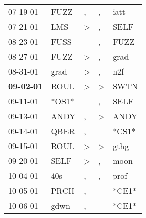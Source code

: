 \begin{supertabular}{p{0.07\textwidth}p{0.06\textwidth}p{0.02\textwidth}p{0.02\textwidth}p{0.06\textwidth}}
          07-19-01\textsuperscript{} &           FUZZ\textsuperscript{} &                , &                , &           iatt\textsuperscript{} \\
          07-21-01\textsuperscript{} &            LMS\textsuperscript{} &     \textgreater &                , &           SELF\textsuperscript{} \\
          08-23-01\textsuperscript{} &           FUSS\textsuperscript{} &                  &                , &           FUZZ\textsuperscript{} \\
          08-27-01\textsuperscript{} &           FUZZ\textsuperscript{} &     \textgreater &                , &           grad\textsuperscript{} \\
          08-31-01\textsuperscript{} &           grad\textsuperscript{} &     \textgreater &                , &            n2f\textsuperscript{} \\
 \textbf{09-02-01\textsuperscript{}} &           ROUL\textsuperscript{} &     \textgreater &     \textgreater &           SWTN\textsuperscript{} \\
          09-11-01\textsuperscript{} &                            *OS1* &                  &                , &           SELF\textsuperscript{} \\
          09-13-01\textsuperscript{} &           ANDY\textsuperscript{} &                , &     \textgreater &           ANDY\textsuperscript{} \\
          09-14-01\textsuperscript{} &           QBER\textsuperscript{} &                , &                  &                            *CS1* \\
          09-15-01\textsuperscript{} &           ROUL\textsuperscript{} &     \textgreater &     \textgreater &           gthg\textsuperscript{} \\
          09-20-01\textsuperscript{} &           SELF\textsuperscript{} &     \textgreater &                , &           moon\textsuperscript{} \\
          10-04-01\textsuperscript{} &            40s\textsuperscript{} &                , &                , &           prof\textsuperscript{} \\
          10-05-01\textsuperscript{} &           PRCH\textsuperscript{} &                , &                  &                            *CE1* \\
          10-06-01\textsuperscript{} &           gdwn\textsuperscript{} &                , &                  &                            *CE1* \\

\end{supertabular}
